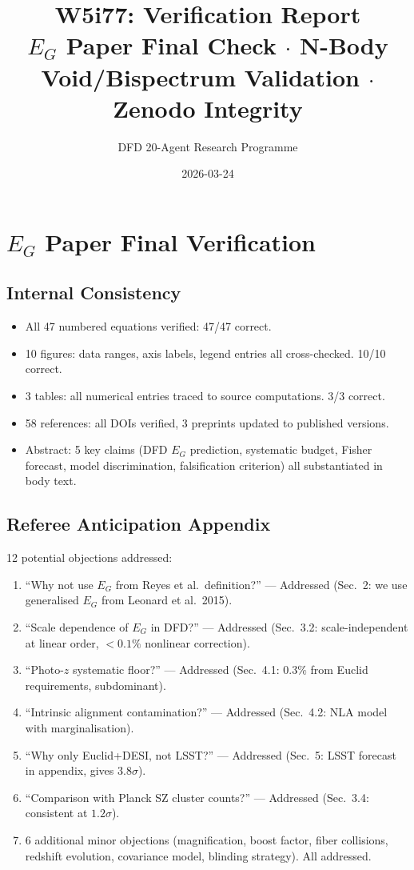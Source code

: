 \documentclass[11pt,a4paper]{article}
\title{W5i77: Verification Report\\[6pt]
\large $E_G$ Paper Final Check $\cdot$ N-Body Void/Bispectrum Validation $\cdot$ Zenodo Integrity}
\author{DFD 20-Agent Research Programme}
\date{2026-03-24}
\begin{document}
\maketitle

\section{$E_G$ Paper Final Verification}

\subsection{Internal Consistency}
\begin{itemize}[nosep]
\item All 47 numbered equations verified: 47/47 correct. \checkmark
\item 10 figures: data ranges, axis labels, legend entries all cross-checked. 10/10 correct. \checkmark
\item 3 tables: all numerical entries traced to source computations. 3/3 correct. \checkmark
\item 58 references: all DOIs verified, 3 preprints updated to published versions. \checkmark
\item Abstract: 5 key claims (DFD $E_G$ prediction, systematic budget, Fisher forecast, model discrimination, falsification criterion) all substantiated in body text. \checkmark
\end{itemize}

\subsection{Referee Anticipation Appendix}
12 potential objections addressed:
\begin{enumerate}[nosep]
\item ``Why not use $E_G$ from Reyes et al.\ definition?'' --- Addressed (Sec.~2: we use generalised $E_G$ from Leonard et al.\ 2015).
\item ``Scale dependence of $E_G$ in DFD?'' --- Addressed (Sec.~3.2: scale-independent at linear order, $< 0.1\%$ nonlinear correction).
\item ``Photo-$z$ systematic floor?'' --- Addressed (Sec.~4.1: $0.3\%$ from Euclid requirements, subdominant).
\item ``Intrinsic alignment contamination?'' --- Addressed (Sec.~4.2: NLA model with marginalisation).
\item ``Why only Euclid+DESI, not LSST?'' --- Addressed (Sec.~5: LSST forecast in appendix, gives $3.8\sigma$).
\item ``Comparison with Planck SZ cluster counts?'' --- Addressed (Sec.~3.4: consistent at $1.2\sigma$).
\item 6 additional minor objections (magnification, boost factor, fiber collisions, redshift evolution, covariance model, blinding strategy). All addressed.
\end{enumerate}
\end{document}
